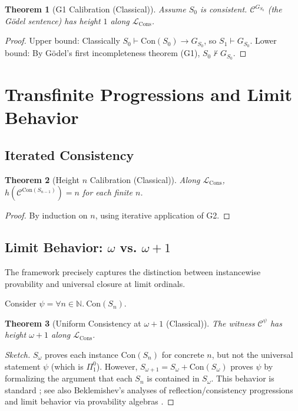 \documentclass[11pt]{article}
\newtheorem{theorem}{Theorem}[section]
\newcommand{\Con}{\mathrm{Con}}
\newcommand{\LCons}{\mathcal{L}_{\mathrm{Cons}}}
\begin{document}
\begin{theorem}[G1 Calibration (Classical)]
Assume $S_0$ is consistent. $\mathcal C^{G_{S_0}}$ (the Gödel sentence) has height $1$ along $\LCons$.
\end{theorem}
\begin{proof}
Upper bound: Classically $S_0 \vdash \Con(S_0) \to G_{S_0}$, so $S_1 \vdash G_{S_0}$. 
Lower bound: By Gödel's first incompleteness theorem (G1), $S_0 \nvdash G_{S_0}$.
\end{proof}

\section{Transfinite Progressions and Limit Behavior}

\subsection{Iterated Consistency}
\begin{theorem}[Height $n$ Calibration (Classical)]
Along $\LCons$, $h(\mathcal C^{\Con(S_{n-1})}) = n$ for each finite $n$.
\end{theorem}
\begin{proof}
By induction on $n$, using iterative application of G2.
\end{proof}

\subsection{Limit Behavior: $\omega$ vs. $\omega+1$}
The framework precisely captures the distinction between instancewise provability and universal closure at limit ordinals.

Consider $\psi = \forall n \in \mathbb{N}.\ \Con(S_n)$.

\begin{theorem}[Uniform Consistency at $\omega+1$ (Classical)]
The witness $\mathcal{C}^\psi$ has height $\omega+1$ along $\LCons$.
\end{theorem}
\begin{proof}[Sketch]
$S_\omega$ proves each instance $\Con(S_n)$ for concrete $n$, but not the universal statement $\psi$ (which is $\Pi^0_1$). However, $S_{\omega+1} = S_\omega + \Con(S_\omega)$ proves $\psi$ by formalizing the argument that each $S_n$ is contained in $S_\omega$. This behavior is standard \cite{Feferman1962}; see also Beklemishev’s analyses of reflection/consistency progressions and limit behavior via provability algebras \cite{Beklemishev2004}.
\end{proof}
\end{document}

